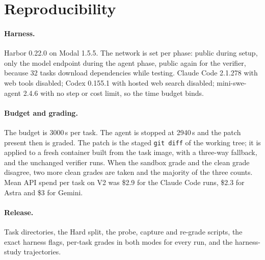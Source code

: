 \section{Reproducibility}
\label{app:repro}

\paragraph{Harness.} Harbor 0.22.0 on Modal 1.5.5. The network is set per phase: public during setup, only the model endpoint during the agent phase, public again for the verifier, because 32 tasks download dependencies while testing. Claude Code 2.1.278 with web tools disabled; Codex 0.155.1 with hosted web search disabled; mini-swe-agent 2.4.6 with no step or cost limit, so the time budget binds.

\paragraph{Budget and grading.} The budget is 3000\,s per task. The agent is stopped at 2940\,s and the patch present then is graded. The patch is the staged \texttt{git diff} of the working tree; it is applied to a fresh container built from the task image, with a three-way fallback, and the unchanged verifier runs. When the sandbox grade and the clean grade disagree, two more clean grades are taken and the majority of the three counts. Mean API spend per task on V2 was \$2.9 for the Claude Code runs, \$2.3 for Astra and \$3 for Gemini.

\paragraph{Release.} Task directories, the Hard split, the probe, capture and re-grade scripts, the exact harness flags, per-task grades in both modes for every run, and the harness-study trajectories.
